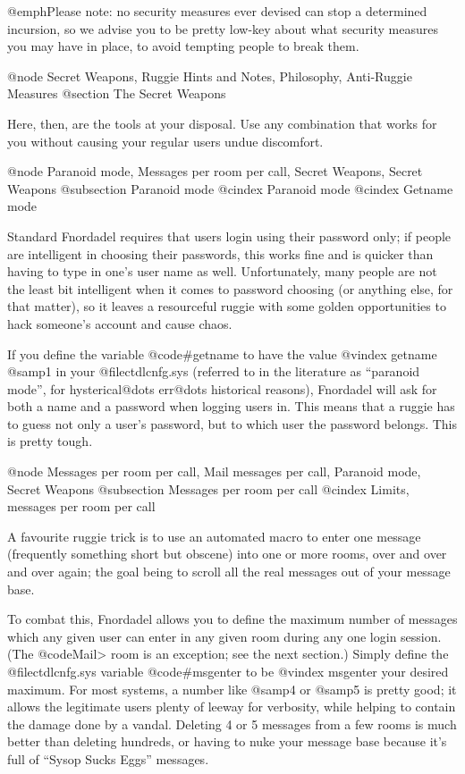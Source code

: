 @emph{Please note:} no security measures
ever devised can stop a determined incursion, so we advise you
to be pretty low-key about what security measures you may have in
place, to avoid tempting people to break them.

@node Secret Weapons, Ruggie Hints and Notes, Philosophy, Anti-Ruggie Measures
@section The Secret Weapons

Here, then, are the tools at your disposal.  Use any
combination that works for you without causing your regular users
undue discomfort.

@node Paranoid mode, Messages per room per call, Secret Weapons, Secret Weapons
@subsection Paranoid mode
@cindex Paranoid mode
@cindex Getname mode

Standard Fnordadel requires that users login
using their password only; if people are intelligent in
choosing their passwords, this works fine and is quicker
than having to type in one's user name as well.  Unfortunately,
many people are not the least bit intelligent when it
comes to password choosing (or anything else, for that
matter), so it leaves a resourceful ruggie with some
golden opportunities to hack someone's account and cause
chaos.

If you define the variable @code{#getname} to have the value
@vindex getname
@samp{1} in your @file{ctdlcnfg.sys} (referred to in the literature as
``paranoid mode'', for hysterical@dots{} err@dots{} historical reasons),
Fnordadel will ask for both a name and a
password when logging users in.  This means that a ruggie
has to guess not only a user's password, but to which user
the password belongs.  This is pretty tough.

@node Messages per room per call, Mail messages per call, Paranoid mode, Secret Weapons
@subsection Messages per room per call
@cindex Limits, messages per room per call

A favourite ruggie trick is to use an automated
macro to enter one message (frequently something short but
obscene) into one or more rooms, over and over and over
again; the goal being to scroll all the real messages out
of your message base.

To combat this, Fnordadel allows you to define
the maximum number of messages which any given user can
enter in any given room during any one login session.
(The @code{Mail>} room is an exception; see the next section.)
Simply define the @file{ctdlcnfg.sys} variable @code{#msgenter} to be
@vindex msgenter
your desired maximum.  For most systems, a number like @samp{4}
or @samp{5} is pretty good; it allows the legitimate users
plenty of leeway for verbosity, while helping to contain
the damage done by a vandal.  Deleting 4 or 5 messages
from a few rooms is much better than deleting hundreds,
or having to nuke your message base because it's full of
``Sysop Sucks Eggs'' messages.

